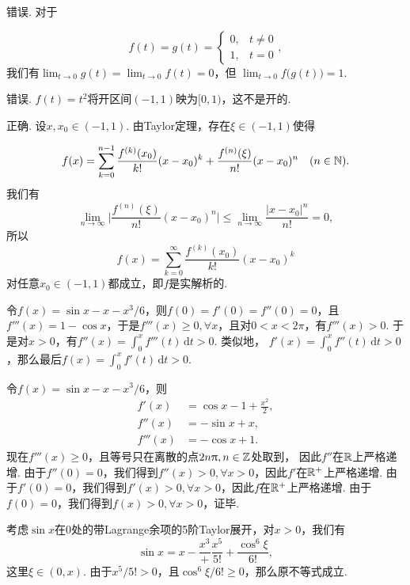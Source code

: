 \begin{ans}
  \begin{enumb}
    \item 错误. 对于
  \end{enumb}
  \[ f(t)=g(t)=\begin{cases}
    0, &t\ne0\\
    1, &t=0
  \end{cases}, \]
  我们有$\lim_{t\to0}g(t)=\lim_{t\to0}f(t)=0$，但
  $\lim_{t\to0}f\big(g(t)\big)=1$.\\
  \begin{enumb}\setcounter{enumi}{1}
    \item 错误. $f(t)=t^2$将开区间$(-1,1)$映为$[0,1)$，这不是开的.
    \item 正确. 设$x,x_0\in(-1,1)$. 由Taylor定理，存在$\xi\in(-1,1)$使得
  \end{enumb}
        \[
          f(x) = \sum_{k=0}^{n-1}\frac{f^{(k)}(x_0)}{k!}(x-x_0)^k
          +\frac{f^{(n)}(\xi)}{n!}(x-x_0)^n\quad(n\in\mathbb N).
        \]
      我们有
      \[ \lim_{n\to\infty}\bigg| \frac{f^{(n)}(\xi)}{n!}(x-x_0)^n \bigg| \le
      \lim_{n\to\infty}\frac{|x-x_0|^n}{n!}=0,\]
      所以
      \[ f(x) = \sum_{k=0}^{\infty}\frac{f^{(k)}(x_0)}{k!}(x-x_0)^k
      \]
      对任意$x_0\in(-1,1)$都成立，即$f$是实解析的.
\end{ans}

\begin{ans}
  \method 令$f(x)=\sin x-x-x^3/6$，则$f(0)=f'(0)=f''(0)=0$，且$f'''(x)=1-\cos x$，于是$f'''(x)\ge0,\forall x$，且对$0<x<2\pi$，有$f'''(x)>0$. 于是对$x>0$，有$f''(x)=\int_0^xf'''(t)\,\mathrm dt>0$. 类似地， $f'(x)=\int_0^xf''(t)\,\mathrm dt>0$，那么最后$f(x)=\int_0^xf'(t)\,\mathrm dt>0$.

  \method 令$f(x)=\sin x-x-x^3/6$，则
  \begin{align*}
    f'(x) & = \cos x -1 +\frac{x^2}2,\\
    f''(x) & = -\sin x + x,\\
    f'''(x) & = -\cos x + 1.
  \end{align*}
  现在$f'''(x)\ge0$，且等号只在离散的点$2n\uppi,n\in\mathbb Z$处取到， 因此$f''$在$\mathbb R$上严格递增. 由于$f''(0)=0$，我们得到$f''(x)>0,\forall x>0$，因此$f'$在$\mathbb R^+$上严格递增. 由于$f'(0)=0$，我们得到$f'(x)>0,\forall x>0$，因此$f$在$\mathbb R^+$上严格递增. 由于$f(0)=0$，我们得到$f(x)>0,\forall x>0$，证毕.

  \method 考虑$\sin x$在$0$处的带Lagrange余项的5阶Taylor展开，对$x>0$，我们有
  \[
    \sin x = x-\frac{x^3}+\frac{x^5}{5!}+\frac{\cos^6\xi}{6!},
  \]
  这里$\xi\in(0,x)$. 由于$x^5/5!>0$，且$\cos^6\xi/6!\ge0$，那么原不等式成立.
\end{ans}

